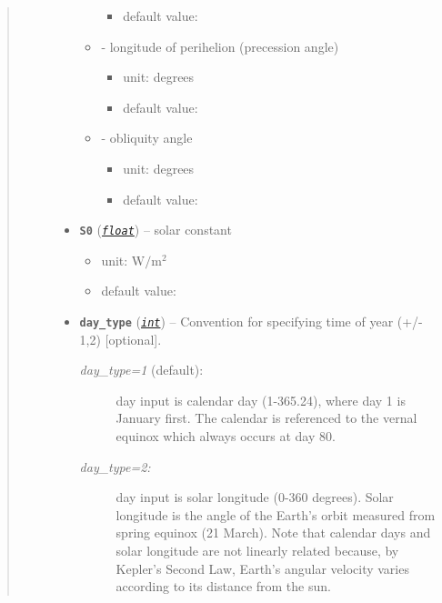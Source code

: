\documentclass[a4paper,10pt,english]{sphinxmanual}
\begin{document}
\begin{fulllineitems}
\begin{quote}
\begin{description}
\begin{itemize}
\begin{itemize}
\begin{itemize}
\item {} 
default value: 

\end{itemize}

\item {} 
 - longitude of perihelion (precession angle)
\begin{itemize}
\item {} 
unit: degrees

\item {} 
default value: 

\end{itemize}

\item {} 
 - obliquity angle
\begin{itemize}
\item {} 
unit: degrees

\item {} 
default value: 

\end{itemize}

\end{itemize}


\item {} 
\textbf{\texttt{S0}} (\href{http://docs.python.org/2.7/library/functions.html\#float}{\emph{\texttt{float}}}) -- 
solar constant
\begin{itemize}
\item {} 
unit: \(\textrm{W}/\textrm{m}^2\)

\item {} 
default value: 

\end{itemize}


\item {} 
\textbf{\texttt{day\_type}} (\href{http://docs.python.org/2.7/library/functions.html\#int}{\emph{\texttt{int}}}) -- 
Convention for specifying time of year (+/- 1,2) {[}optional{]}.
\begin{description}
\item[{\emph{day\_type=1} (default):}] \leavevmode
day input is calendar day (1-365.24), where day 1
is January first. The calendar is referenced to the 
vernal equinox which always occurs at day 80.

\item[{\emph{day\_type=2:} }] \leavevmode
day input is solar longitude (0-360 degrees). Solar
longitude is the angle of the Earth's orbit measured from spring
equinox (21 March). Note that calendar days and solar longitude are
not linearly related because, by Kepler's Second Law, Earth's
angular velocity varies according to its distance from the sun.


\end{description}
\end{itemize}
\end{description}
\end{quote}
\end{fulllineitems}
\end{document}
